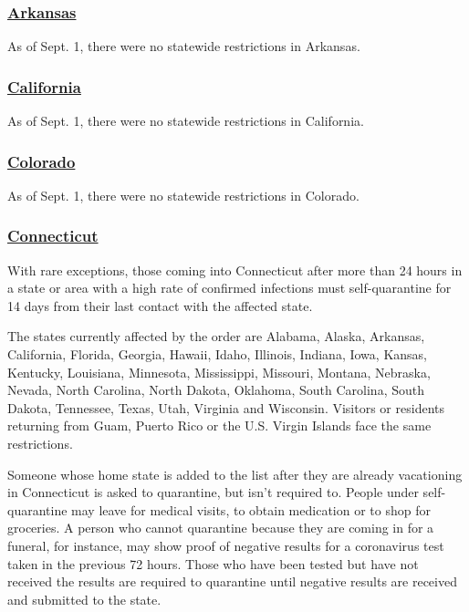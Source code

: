 \hypertarget{arkansas}{%
\subsubsection{\texorpdfstring{\href{https://www.arkansas.com/travel-advisory/covid-19}{Arkansas}}{Arkansas}}\label{arkansas}}

As of Sept. 1, there were no statewide restrictions in Arkansas.

\hypertarget{california}{%
\subsubsection{\texorpdfstring{\href{https://www.visitcalifornia.com/latest-covid-19-coronavirus}{California}}{California}}\label{california}}

As of Sept. 1, there were no statewide restrictions in California.

\hypertarget{colorado}{%
\subsubsection{\texorpdfstring{\href{https://covid19.colorado.gov/prepare-protect-yourself/prevent-the-spread/travel}{Colorado}}{Colorado}}\label{colorado}}

As of Sept. 1, there were no statewide restrictions in Colorado.

\hypertarget{connecticut}{%
\subsubsection{\texorpdfstring{\href{https://portal.ct.gov/Coronavirus/Covid-19-Knowledge-Base/Travel-In-or-Out-of-CT}{Connecticut}}{Connecticut}}\label{connecticut}}

With rare exceptions, those coming into Connecticut after more than 24
hours in a state or area with a high rate of confirmed infections must
self-quarantine for 14 days from their last contact with the affected
state.

The states currently affected by the order are Alabama, Alaska,
Arkansas, California, Florida, Georgia, Hawaii, Idaho, Illinois,
Indiana, Iowa, Kansas, Kentucky, Louisiana, Minnesota, Mississippi,
Missouri, Montana, Nebraska, Nevada, North Carolina, North Dakota,
Oklahoma, South Carolina, South Dakota, Tennessee, Texas, Utah, Virginia
and Wisconsin. Visitors or residents returning from Guam, Puerto Rico or
the U.S. Virgin Islands face the same restrictions.

Someone whose home state is added to the list after they are already
vacationing in Connecticut is asked to quarantine, but isn't required
to. People under self-quarantine may leave for medical visits, to obtain
medication or to shop for groceries. A person who cannot quarantine
because they are coming in for a funeral, for instance, may show proof
of negative results for a coronavirus test taken in the previous 72
hours. Those who have been tested but have not received the results are
required to quarantine until negative results are received and submitted
to the state.

